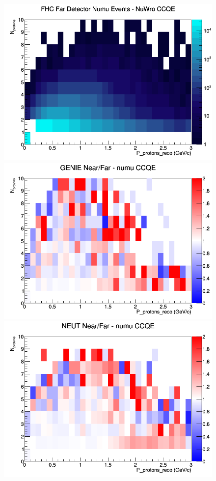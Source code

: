 \begin{figure}[h]
\endminipage
{}
\includegraphics[width=\linewidth]{eff_N_P/LAr/protons/CCQE_FHC_FD_numu_N_P_NuWro.png}
\endminipage
\newline
{}
\includegraphics[width=\linewidth]{eff_N_P/LAr/protons/ratios/CCQE_GENIE_numu_NF_N_P.png}
\endminipage
{}
\includegraphics[width=\linewidth]{eff_N_P/LAr/protons/ratios/CCQE_NEUT_numu_NF_N_P.png}

\end{figure}
